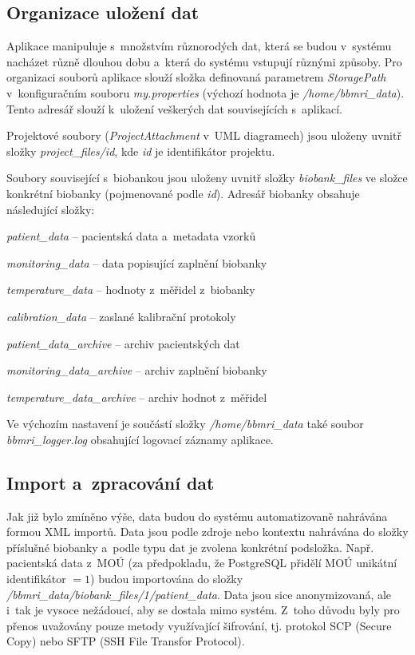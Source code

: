 \documentclass[11pt, draft, oneside]{fithesis2}
\begin{document}
\subsection{Organizace uložení dat}\label{chapter:implementation:subsection:organizationOfDataStorage}
Aplikace manipuluje s~množstvím různorodých dat, která se budou v~systému nacházet různě dlouhou dobu a~která do systému vstupují různými způsoby. Pro organizaci souborů aplikace slouží složka definovaná parametrem \textit{StoragePath} v~konfiguračním souboru \textit{my.properties} (výchozí hodnota je \textit{/home/bbmri\_data}). Tento adresář slouží k~uložení veškerých dat souvisejících s~aplikací.

Projektové soubory (\textit{ProjectAttachment} v~UML diagramech) jsou uloženy uvnitř složky \textit{project\_files/id}, kde \textit{id} je identifikátor projektu. 

Soubory související s~biobankou jsou uloženy uvnitř složky \textit{biobank\_files} ve složce konkrétní biobanky (pojmenované podle \textit{id}). Adresář biobanky obsahuje následující složky: 
\begin{compactitem}
	\item \textit{patient\_data} -- pacientská data a~metadata vzorků
	\item \textit{monitoring\_data} -- data popisující zaplnění biobanky
	\item \textit{temperature\_data} -- hodnoty z~měřidel z~biobanky
	\item \textit{calibration\_data} -- zaslané kalibrační protokoly
	\item \textit{patient\_data\_archive} -- archiv pacientských dat
	\item \textit{monitoring\_data\_archive} -- archiv zaplnění biobanky
	\item \textit{temperature\_data\_archive} -- archiv hodnot z~měřidel
\end{compactitem}

Ve výchozím nastavení je součástí složky \textit{/home/bbmri\_data} také soubor \textit{bbmri\_logger.log} obsahující logovací záznamy aplikace. 

\subsection{Import a~zpracování dat}\label{chapter:implementation:subsection:import}
Jak již bylo zmíněno výše, data budou do systému automatizovaně nahrávána formou XML importů. Data jsou podle zdroje nebo kontextu nahrávána do složky příslušné biobanky a~podle typu dat je zvolena konkrétní podsložka. Např. pacientská data z~MOÚ (za předpokladu, že PostgreSQL přidělí MOÚ unikátní identifikátor $= 1$) budou importována do složky \textit{/bbmri\_data/biobank\_files/1/patient\_data}. Data jsou sice anonymizovaná, ale i~tak je vysoce nežádoucí, aby se dostala mimo systém. Z~toho důvodu byly pro přenos uvažovány pouze metody využívající šifrování, tj. protokol SCP (Secure Copy) nebo SFTP (SSH File Transfor Protocol). 
\end{document}
